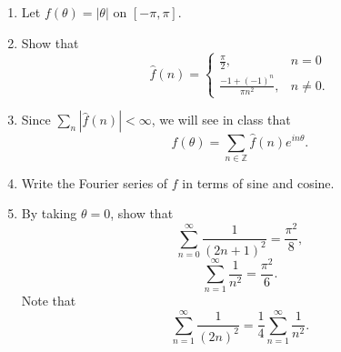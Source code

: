 \documentclass{article}
\theoremstyle{definition} %
\numberwithin{thm}{section} %
\theoremstyle{definition} %
\begin{document}
\section{}

\begin{enumerate}[label=(\alph*)]
    \item Let $f(\theta) = |\theta|$ on $[-\pi, \pi]$.
    \item Show that
\[
\hat{f}(n) = \begin{cases}
\frac{\pi}{2}, & n = 0 \\
\frac{-1 + (-1)^n}{\pi n^2}, & n \neq 0.
\end{cases}
\]

    \item Since $\sum_{n} |\hat{f}(n)| < \infty$, we will see in class that
\[
f(\theta) = \sum_{n \in \mathbb{Z}} \hat{f}(n) e^{in\theta}.
\]
    \item Write the Fourier series of $f$ in terms of sine and cosine.

    \item By taking $\theta = 0$, show that
\[
\sum_{n=0}^{\infty} \frac{1}{(2n+1)^2} = \frac{\pi^2}{8},
\]
\[
\sum_{n=1}^{\infty} \frac{1}{n^2} = \frac{\pi^2}{6}.
\]
Note that
\[
\sum_{n=1}^{\infty} \frac{1}{(2n)^2} = \frac{1}{4} \sum_{n=1}^{\infty} \frac{1}{n^2}.
\]
\end{enumerate}
\end{document}
